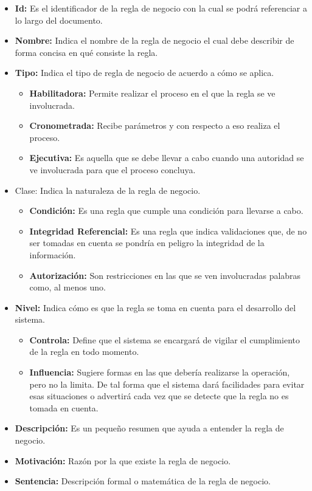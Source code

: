 \begin{itemize}
	\item \textbf{Id:} Es el identificador de la regla de negocio con la 
	cual se podrá referenciar a lo largo del documento.
	\item \textbf{Nombre:} Indica el nombre de la regla de negocio el cual 
	debe describir de forma concisa en qué consiste la regla.
	\item \textbf{Tipo:} Indica el tipo de regla de negocio de acuerdo a 
	cómo se aplica.
	\begin{itemize}
		\item \textbf{Habilitadora:} Permite realizar el proceso en el 
		que la regla se ve involucrada.
		\item \textbf{Cronometrada:} Recibe parámetros y con respecto a 
		eso realiza el proceso.
		\item \textbf{Ejecutiva:} Es aquella que se debe llevar a cabo 
		cuando una autoridad se ve involucrada para que el proceso 
		concluya.
	\end{itemize}
	\item Clase: Indica la naturaleza de la regla de negocio.
		\begin{itemize}
		\item \textbf{Condición:} Es una regla que cumple una condición 
		para llevarse a cabo.
		\item \textbf{Integridad Referencial:} Es una regla que indica 
		validaciones que, de no ser tomadas en cuenta se pondría en 
		peligro la integridad de la información.
		\item \textbf{Autorización:} Son restricciones en las que se ven 
		involucradas palabras como, al menos uno.
		\end{itemize}
	\item \textbf{Nivel:} Indica cómo es que la regla se toma en cuenta para 
	el desarrollo del sistema.
		\begin{itemize}
		\item \textbf{Controla:} Define que el sistema se encargará de 
		vigilar el cumplimiento de la regla en todo momento.
		\item \textbf{Influencia:} Sugiere formas en las que debería 
		realizarse la operación, pero no la limita. De tal forma que el 
		sistema dará facilidades para evitar esas situaciones o 
		advertirá cada vez que se detecte que la regla no es tomada en 
		cuenta.
		\end{itemize}
	\item \textbf{Descripción:} Es un pequeño resumen que ayuda a entender 
	la regla de negocio.
	\item \textbf{Motivación:} Razón por la que existe la regla de negocio.
	\item \textbf{Sentencia:} Descripción formal o matemática de la regla de 
	negocio.
\end{itemize}
